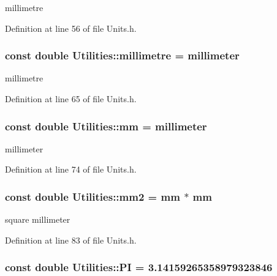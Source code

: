millimetre 



Definition at line 56 of file Units.h.

\hypertarget{namespace_utilities_a8a754864202e3b90c9f70df567799d24}{
\subsubsection[{millimetre}]{\setlength{\rightskip}{0pt plus 5cm}const double {\bf Utilities::millimetre} = {\bf millimeter}}}
\label{namespace_utilities_a8a754864202e3b90c9f70df567799d24}


millimetre 



Definition at line 65 of file Units.h.

\hypertarget{namespace_utilities_ada68d4ec8f02c2ffc43db9220cbdcba8}{
\subsubsection[{mm}]{\setlength{\rightskip}{0pt plus 5cm}const double {\bf Utilities::mm} = {\bf millimeter}}}
\label{namespace_utilities_ada68d4ec8f02c2ffc43db9220cbdcba8}


millimeter 



Definition at line 74 of file Units.h.

\hypertarget{namespace_utilities_a1bfe965c55c47b8f84c53b95d527da39}{
\subsubsection[{mm2}]{\setlength{\rightskip}{0pt plus 5cm}const double {\bf Utilities::mm2} = {\bf mm} $\ast$ {\bf mm}}}
\label{namespace_utilities_a1bfe965c55c47b8f84c53b95d527da39}


square millimeter 



Definition at line 83 of file Units.h.

\hypertarget{namespace_utilities_a119d98992bec0bd0923f88ebf77ed86f}{
\subsubsection[{PI}]{\setlength{\rightskip}{0pt plus 5cm}const double {\bf Utilities::PI} = 3.14159265358979323846}}
\label{namespace_utilities_a119d98992bec0bd0923f88ebf77ed86f}


